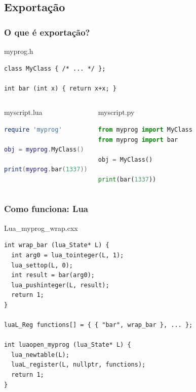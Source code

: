\documentclass[brazil]{beamer}
\begin{document}
\subsection{Exportação}
\begin{frame}[fragile]
  \frametitle{O que é exportação?}
  \pause
  \begin{block}{myprog.h}
    \begin{lstlisting}
class MyClass { /* ... */ };

int bar (int x) { return x+x; }
    \end{lstlisting}
  \end{block}
  \pause
  \begin{columns}
      \begin{block}{myscript.lua}
        \begin{lstlisting}[language=lua]
require 'myprog'

obj = myprog.MyClass()

print(myprog.bar(1337))
        \end{lstlisting}
      \end{block}
    \pause
      \begin{block}{myscript.py}
        \begin{lstlisting}[language=python]
from myprog import MyClass
from myprog import bar

obj = MyClass()

print(bar(1337))
        \end{lstlisting}
      \end{block}
  \end{columns}
\end{frame}
\begin{frame}[fragile]
  \frametitle{Como funciona: Lua}
  \pause
  \begin{block}{Lua\_myprog\_wrap.cxx}
    \begin{lstlisting}
int wrap_bar (lua_State* L) {
  int arg0 = lua_tointeger(L, 1);
  lua_settop(L, 0);
  int result = bar(arg0);
  lua_pushinteger(L, result);
  return 1;
}

luaL_Reg functions[] = { { "bar", wrap_bar }, ... };

int luaopen_myprog (lua_State* L) {
  lua_newtable(L);
  luaL_register(L, nullptr, functions);
  return 1;
}
    \end{lstlisting}
  \end{block}
\end{frame}
\end{document}
